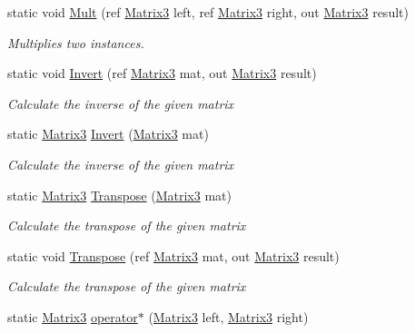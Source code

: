 \begin{DoxyCompactItemize}
static void \hyperlink{struct_open_t_k_1_1_matrix3_acb2bf453634be2ae4efd8ce45e891c13}{Mult} (ref \hyperlink{struct_open_t_k_1_1_matrix3}{Matrix3} left, ref \hyperlink{struct_open_t_k_1_1_matrix3}{Matrix3} right, out \hyperlink{struct_open_t_k_1_1_matrix3}{Matrix3} result)
\begin{DoxyCompactList}\small\item\em Multiplies two instances. \end{DoxyCompactList}\item 
static void \hyperlink{struct_open_t_k_1_1_matrix3_a0e7ce748833990c0ee1a61a4ff262f66}{Invert} (ref \hyperlink{struct_open_t_k_1_1_matrix3}{Matrix3} mat, out \hyperlink{struct_open_t_k_1_1_matrix3}{Matrix3} result)
\begin{DoxyCompactList}\small\item\em Calculate the inverse of the given matrix \end{DoxyCompactList}\item 
static \hyperlink{struct_open_t_k_1_1_matrix3}{Matrix3} \hyperlink{struct_open_t_k_1_1_matrix3_aa389711eb8b6a04cc3fba73086899f57}{Invert} (\hyperlink{struct_open_t_k_1_1_matrix3}{Matrix3} mat)
\begin{DoxyCompactList}\small\item\em Calculate the inverse of the given matrix \end{DoxyCompactList}\item 
static \hyperlink{struct_open_t_k_1_1_matrix3}{Matrix3} \hyperlink{struct_open_t_k_1_1_matrix3_a5250dc0e7be9235afcd7a8c45e32068f}{Transpose} (\hyperlink{struct_open_t_k_1_1_matrix3}{Matrix3} mat)
\begin{DoxyCompactList}\small\item\em Calculate the transpose of the given matrix \end{DoxyCompactList}\item 
static void \hyperlink{struct_open_t_k_1_1_matrix3_a2086cb889f400f703b0d550591a68901}{Transpose} (ref \hyperlink{struct_open_t_k_1_1_matrix3}{Matrix3} mat, out \hyperlink{struct_open_t_k_1_1_matrix3}{Matrix3} result)
\begin{DoxyCompactList}\small\item\em Calculate the transpose of the given matrix \end{DoxyCompactList}\item 
static \hyperlink{struct_open_t_k_1_1_matrix3}{Matrix3} \hyperlink{struct_open_t_k_1_1_matrix3_a80dcea283053df0ecf97a8ee6b14b998}{operator$\ast$} (\hyperlink{struct_open_t_k_1_1_matrix3}{Matrix3} left, \hyperlink{struct_open_t_k_1_1_matrix3}{Matrix3} right)

\end{DoxyCompactItemize}
